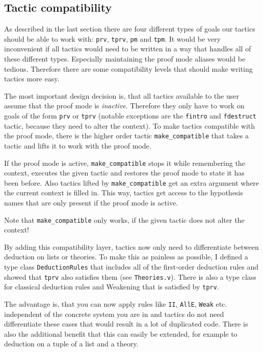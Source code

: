 \documentclass[12pt, a4paper]{article}
\begin{document}
\subsection{Tactic compatibility}

As described in the last section there are four different types of goals our tactics should be able to work with: \texttt{prv}, \texttt{tprv}, \texttt{pm} and \texttt{tpm}.
It would be very inconvenient if all tactics would need to be written in a way that handles all of these different types.
Especially maintaining the proof mode aliases would be tedious.
Therefore there are some compatibility levels that should make writing tactics more easy.

\medskip\noindent
The most important design decision is, that all tactics available to the user assume that the proof mode is \emph{inactive}.
Therefore they only have to work on goals of the form \texttt{prv} or \texttt{tprv} (notable exceptions are the \texttt{fintro} and \texttt{fdestruct} tactic, because they need to alter the context).
To make tactics compatible with the proof mode, there is the higher order tactic \texttt{make\_compatible} that takes a tactic and lifts it to work with the proof mode.

If the proof mode is active, \texttt{make\_compatible} stops it while remembering the context, executes the given tactic and  restores the proof mode to state it has been before.
Also tactics lifted by \texttt{make\_compatible} get an extra argument where the current context is filled in.
This way, tactics get access to the hypothesis names that are only present if the proof mode is active.

Note that \texttt{make\_compatible} only works, if the given tactic does not alter the context!

\medskip\noindent
By adding this compatibility layer, tactics now only need to differentiate between deduction on lists or theories.
To make this as painless as possible, I defined a type class \texttt{DeductionRules} that includes all of the first-order deduction rules and showed that \texttt{tprv} also satisfies them (see \texttt{Theories.v}).
There is also a type class for classical deduction rules and Weakening that is satisfied by \texttt{tprv}.

The advantage is, that you can now apply rules like \texttt{II}, \texttt{AllE}, \texttt{Weak} etc. independent of the concrete system you are in and tactics do not need differentiate these cases that would result in a lot of duplicated code.
There is also the additional benefit that this can easily be extended, for example to deduction on a tuple of a list and a theory.
\end{document}
